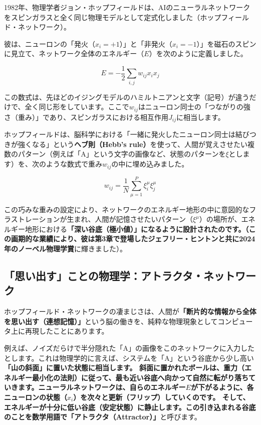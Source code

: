 1982年、物理学者ジョン・ホップフィールドは、AIのニューラルネットワークをスピンガラスと全く同じ物理モデルとして定式化しました（ホップフィールド・ネットワーク）。

彼は、ニューロンの「発火（\(x_i = +1\)）」と「非発火（\(x_i = -1\)）」を磁石のスピンに見立て、ネットワーク全体のエネルギー（\(E\)）を次のように定義しました。

\[E = -\frac{1}{2} \sum_{i,j} w_{ij} x_i x_j\]

この数式は、先ほどのイジングモデルのハミルトニアンと文字（記号）が違うだけで、全く同じ形をしています。ここで\(w_{ij}\)はニューロン同士の「つながりの強さ（重み）」であり、スピンガラスにおける相互作用\(J_{ij}\)に相当します。

ホップフィールドは、脳科学における「一緒に発火したニューロン同士は結びつきが強くなる」という\textbf{ヘブ則（Hebb's rule）}を使って、人間が覚えさせたい複数のパターン（例えば「A」という文字の画像など、状態のパターンを\(\xi\)とします）を、次のような数式で重み\(w_{ij}\)の中に埋め込みました。

\[w_{ij} = \frac{1}{N} \sum_{\mu=1}^{P} \xi_i^\mu \xi_j^\mu\]

この巧みな重みの設定により、ネットワークのエネルギー地形の中に意図的なフラストレーションが生まれ、人間が記憶させたいパターン（\(\xi^\mu\)）の場所が、エネルギー地形における\textbf{「深い谷底（極小値）」になるように設計されたのです。（この画期的な業績により、彼は第3章で登場したジェフリー・ヒントンと共に2024年のノーベル物理学賞}に輝きました）。

\subsection{「思い出す」ことの物理学：アトラクタ・ネットワーク}

ホップフィールド・ネットワークの凄まじさは、人間が\textbf{「断片的な情報から全体を思い出す（連想記憶）」}という脳の働きを、純粋な物理現象としてコンピュータ上に再現したことにあります。

例えば、ノイズだらけで半分隠れた「A」の画像をこのネットワークに入力したとします。これは物理学的に言えば、システムを「A」という谷底から少し高い\textbf{「山の斜面」に置いた状態に相当します。 斜面に置かれたボールは、重力（エネルギー最小化の法則）に従って、最も近い谷底へ向かって自然に転がり落ちていきます。ニューラルネットワークは、自らのエネルギー\(E\)が下がるように、各ニューロンの状態（\(x_i\)）を次々と更新（フリップ）していくのです。 そして、エネルギーが十分に低い谷底（安定状態）に静止します。この引き込まれる谷底のことを数学用語で「アトラクタ（Attractor）」}と呼びます。

